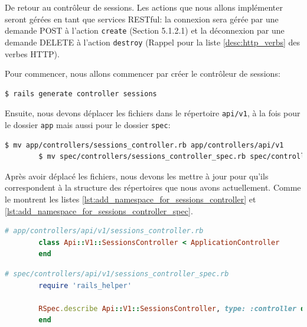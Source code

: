 \documentclass[]{report}
\begin{document}
      De retour au contrôleur de sessions. Les actions que nous allons implémenter seront gérées en tant que services RESTful: la connexion sera gérée par une demande POST à l'action \verb|create| (Section 5.1.2.1) et la déconnexion par une demande DELETE à l'action \verb|destroy| (Rappel pour la liste \ref{desc:http_verbs} des verbes HTTP).

      Pour commencer, nous allons commencer par créer le contrôleur de sessions:

      \begin{scriptsize}
        \begin{lstlisting}[language=bash]
        $ rails generate controller sessions
        \end{lstlisting}
      \end{scriptsize}

      Ensuite, nous devons déplacer les fichiers dans le répertoire \verb|api/v1|, à la fois pour le dossier \verb|app| mais aussi pour le dossier \verb|spec|:

      \begin{scriptsize}
        \begin{lstlisting}[language=bash]
        $ mv app/controllers/sessions_controller.rb app/controllers/api/v1
        $ mv spec/controllers/sessions_controller_spec.rb spec/controllers/api/v1
        \end{lstlisting}
      \end{scriptsize}

      Après avoir déplacé les fichiers, nous devons les mettre à jour pour qu'ils correspondent à la structure des répertoires que nous avons actuellement. Comme le montrent les listes \ref{lst:add_namespace_for_sessions_controller} et \ref{lst:add_namespace_for_sessions_controller_spec}.

      \begin{scriptsize}
        \begin{lstlisting}[language=ruby, caption={Ajout des Namespaces pour le contrôlleur de sessions}, label={lst:add_namespace_for_sessions_controller}]
        # app/controllers/api/v1/sessions_controller.rb
        class Api::V1::SessionsController < ApplicationController
        end
        \end{lstlisting}
      \end{scriptsize}

      \begin{scriptsize}
        \begin{lstlisting}[language=ruby, caption={Ajout des Namespaces pour le test du contrôlleur de sessions}, label={lst:add_namespace_for_sessions_controller_spec}]
        # spec/controllers/api/v1/sessions_controller_spec.rb
        require 'rails_helper'

        RSpec.describe Api::V1::SessionsController, type: :controller do
        end
        \end{lstlisting}
      \end{scriptsize}
\end{document}

